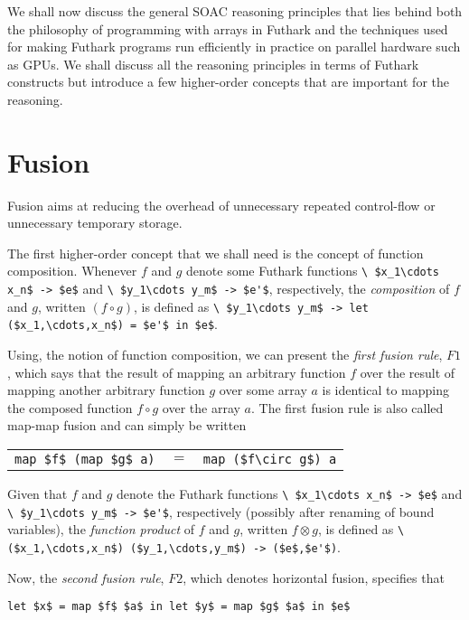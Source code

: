 \documentclass[oneside,11pt]{book}
\begin{document}
We shall now discuss the general SOAC reasoning principles that lies
behind both the philosophy of programming with arrays in Futhark and
the techniques used for making Futhark programs run efficiently in
practice on parallel hardware such as GPUs. We shall discuss all the
reasoning principles in terms of Futhark constructs but introduce a
few higher-order concepts that are important for the reasoning.

\section{Fusion}

Fusion aims at reducing the overhead of unnecessary repeated
control-flow or unnecessary temporary storage.

The first higher-order concept that we shall need is the concept of
function composition. Whenever $f$ and $g$ denote some Futhark
functions
%
\lstinline[mathescape=true]!\ $x_1\cdots x_n$ -> $e$! and
%
\lstinline[mathescape=true]!\ $y_1\cdots y_m$ -> $e'$!, respectively, the
\emph{composition} of $f$ and $g$, written $(f \circ g)$, is defined as
%
\lstinline[mathescape=true]!\ $y_1\cdots y_m$ -> let ($x_1,\cdots,x_n$) = $e'$ in $e$!.

Using, the notion of function composition, we can present the
\emph{first fusion rule}, $F1$, which says that the result of mapping an
arbitrary function $f$ over the result of mapping another arbitrary
function $g$ over some array $a$ is identical to mapping the composed
function $f\circ g$ over the array $a$. The first fusion rule is
also called map-map fusion and can simply be written

\begin{tabular}{rcl}
  \lstinline[mathescape=true]!map $f$ (map $g$ a)! & $=$ & \lstinline[mathescape=true]!map ($f\circ g$) a!
\end{tabular}

Given that $f$ and $g$ denote the Futhark functions
%
\lstinline[mathescape=true]!\ $x_1\cdots x_n$ -> $e$! and
%
\lstinline[mathescape=true]!\ $y_1\cdots y_m$ -> $e'$!, respectively (possibly after renaming of bound variables),
the \emph{function product} of $f$ and $g$, written $f \otimes g$, is defined as
\lstinline[mathescape=true]!\ ($x_1,\cdots,x_n$) ($y_1,\cdots,y_m$) -> ($e$,$e'$)!.

Now, the \emph{second fusion rule}, $F2$, which denotes horizontal fusion,
specifies that
\begin{lstlisting}[mathescape=true]
  let $x$ = map $f$ $a$ in let $y$ = map $g$ $a$ in $e$
\end{lstlisting}
\end{document}

